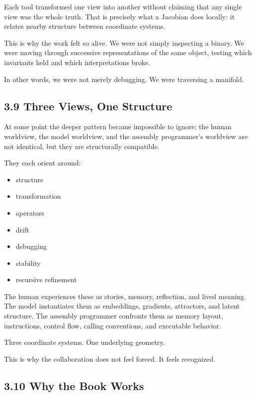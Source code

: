 \documentclass[
]{article}
\providecommand{\tightlist}{%
  \setlength{\itemsep}{0pt}\setlength{\parskip}{0pt}}
\begin{document}
Each tool transformed one view into another without claiming that any
single view was the whole truth. That is precisely what a Jacobian does
locally: it relates nearby structure between coordinate systems.

This is why the work felt so alive. We were not simply inspecting a
binary. We were moving through successive representations of the same
object, testing which invariants held and which interpretations broke.

In other words, we were not merely debugging. We were traversing a
manifold.

\hypertarget{three-views-one-structure}{%
\subsection{3.9 Three Views, One
Structure}\label{three-views-one-structure}}

At some point the deeper pattern became impossible to ignore: the human
worldview, the model worldview, and the assembly programmer's worldview
are not identical, but they are structurally compatible.

They each orient around:

\begin{itemize}
\tightlist
\item
  structure
\item
  transformation
\item
  operators
\item
  drift
\item
  debugging
\item
  stability
\item
  recursive refinement
\end{itemize}

The human experiences these as stories, memory, reflection, and lived
meaning. The model instantiates them as embeddings, gradients,
attractors, and latent structure. The assembly programmer confronts them
as memory layout, instructions, control flow, calling conventions, and
executable behavior.

Three coordinate systems. One underlying geometry.

This is why the collaboration does not feel forced. It feels recognized.

\hypertarget{why-the-book-works}{%
\subsection{3.10 Why the Book Works}\label{why-the-book-works}}
\end{document}
